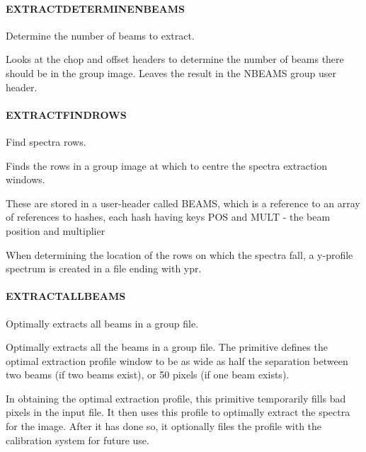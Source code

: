 \documentclass[twoside,11pt]{article}
\renewcommand{\_}{\texttt{\symbol{95}}}
\begin{document}
\paragraph{\_EXTRACT\_DETERMINE\_NBEAMS\_\label{_EXTRACT_DETERMINE_NBEAMS_}}


Determine the number of beams to extract.


\mbox{}


Looks at the chop and offset headers to determine the number of beams
there should be in the group image. Leaves the result in the NBEAMS
group user header.

\paragraph{\_EXTRACT\_FIND\_ROWS\_\label{_EXTRACT_FIND_ROWS_}}


Find spectra rows.


\mbox{}


Finds the rows in a group image at which to centre the spectra 
extraction windows.



These are stored in a user-header called BEAMS, which is a reference
to an array of references to hashes, each hash having keys POS and
MULT - the beam position and multiplier



When determining the location of the rows on which the spectra fall,
a y-profile spectrum is created in a file ending with \_ypr.

\paragraph{\_EXTRACT\_ALL\_BEAMS\_\label{_EXTRACT_ALL_BEAMS_}}


Optimally extracts all beams in a group file.


\mbox{}


Optimally extracts all the beams in a group file. The primitive defines
the optimal extraction profile window to be as wide as half the separation
between two beams (if two beams exist), or 50 pixels (if one beam exists).



In obtaining the optimal extraction profile, this primitive temporarily
fills bad pixels in the input file. It then uses this profile to optimally
extract the spectra for the image. After it has done so, it optionally 
files the profile with the calibration system for future use.
\end{document}
